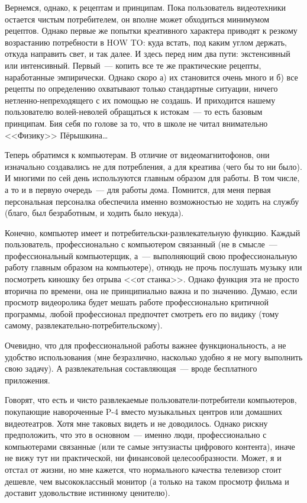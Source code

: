 Вернемся, однако, к рецептам и принципам. Пока пользователь видеотехники остается чистым потребителем, он вполне может обходиться минимумом рецептов. Однако первые же попытки креативного характера приводят к резкому возрастанию потребности в HOW TO: куда встать, под каким углом держать, откуда направить свет, и так далее. И здесь перед ним два пути: экстенсивный или интенсивный. Первый~--- копить все те же практические рецепты, наработанные эмпирически. Однако скоро а) их становится очень много и б) все рецепты по определению охватывают только стандартные ситуации, ничего нетленно-непреходящего с их помощью не создашь. И приходится нашему пользователю волей-неволей обращаться к истокам~--- то есть базовым принципам. Бия себя по голове за то, что в школе не читал внимательно <<Физику>> Пёрышкина\dots

Теперь обратимся к компьютерам. В отличие от видеомагнитофонов, они изначально создавались не для потребления, а для креатива (чего бы то ни было). И многими по сей день используются главным образом для работы. В том числе, а то и в первую очередь~--- для работы дома. Помнится, для меня первая персональная персоналка обеспечила именно возможностью не ходить на службу (благо, был безработным, и ходить было некуда).

Конечно, компьютер имеет и потребительски-развлекательную функцию. Каждый пользователь, профессионально с компьютером связанный (не в смысле~--- профессиональный компьютерщик, а~--- выполняющий свою профессиональную работу главным образом на компьютере), отнюдь не прочь послушать музыку или посмотреть киношку без отрыва <<от станка>>. Однако функция эта не просто вторична по времени, она не принципиально важна и по значению. Думаю, если просмотр видеоролика будет мешать работе профессионально критичной программы, любой профессионал предпочтет смотреть его по видику (тому самому, развлекательно-потребительскому).

Очевидно, что для профессиональной работы важнее функциональность, а не удобство использования (мне безразлично, насколько удобно я не могу выполнить свою задачу). А развлекательная составляющая~--- вроде бесплатного приложения.

Говорят, что есть и чисто развлекаемые пользователи-потребители компьютеров, покупающие навороченные P-4 вместо музыкальных центров или домашних видеотеатров. Хотя мне таковых видеть и не доводилось. Однако рискну предположить, что это в основном~--- именно люди, профессионально с компьютерами связанные (или те самые энтузиасты цифрового контента), иначе не вижу тут ни практической, ни финансовой целесообразности. Может, я и отстал от жизни, но мне кажется, что нормального качества телевизор стоит дешевле, чем высококлассный монитор (а только на таком просмотр фильма и доставит удовольствие истинному ценителю).

